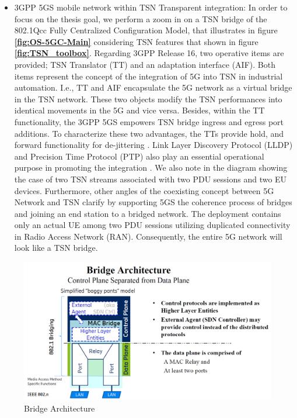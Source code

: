 \begin{itemize}
 
     \item 3GPP 5GS mobile network within TSN Transparent integration:
     In order to focus on the thesis goal, we perform a zoom in on a TSN bridge of the 802.1Qcc Fully Centralized Configuration Model, that illustrates in figure \textbf{\ref{fig:OS-5GC-Main}} considering TSN features that shown in figure
     \textbf{\ref{fig:TSN_toolbox}}. 
       Regarding 3GPP Release 16, two operative items are provided; TSN Translator (TT) and an adaptation interface (AIF). Both items represent the concept of the integration of 5G into TSN in industrial automation. I.e., TT and AIF encapsulate the 5G network as a virtual bridge in the TSN network. These two objects modify the TSN performances into identical movements in the 5G and vice versa.  Besides, within the TT functionality, the 3GPP 5GS empowers TSN bridge ingress and egress port additions. To characterize these two advantages, the TTs provide hold, and forward functionality for de-jittering \cite{Ericsson2019}. Link Layer Discovery Protocol (LLDP) and Precision Time Protocol (PTP) also play an essential operational purpose in promoting the integration \cite{Neumann2018}.
       We also note in the diagram showing the case of two TSN streams associated with two PDU sessions and two EU devices. Furthermore, other angles of the coexisting concept between 5G Network and TSN clarify by supporting 5GS the coherence process of bridges and joining an end station to a bridged network\cite{Ericsson2019}. The deployment contains only an actual UE among two PDU sessions utilizing duplicated connectivity in Radio Access Network (RAN).  Consequently, the entire 5G network will look like a TSN bridge.
     \end{itemize}


 \begin{figure}
\centering
\includegraphics[scale=0.22]{images/Bridge Architecture.png} 
\caption{Bridge Architecture}
\label{fig:Bridge_Architecture}
 \end{figure}
 
